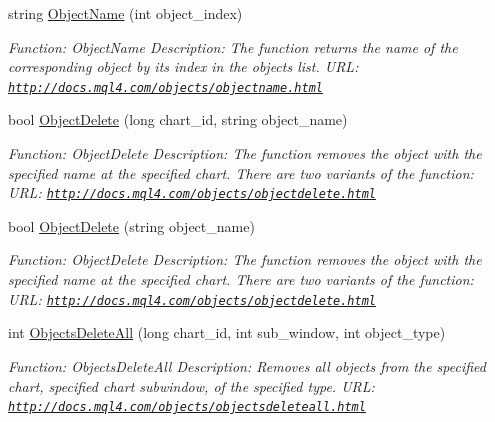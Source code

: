 \begin{DoxyCompactItemize}
string \hyperlink{class_m_q_l4_c_sharp_1_1_base_1_1_m_q_l_base_a199afa072d65c10291f0b877c13c0fcc}{Object\+Name} (int object\+\_\+index)
\begin{DoxyCompactList}\small\item\em Function\+: Object\+Name Description\+: The function returns the name of the corresponding object by its index in the objects list. U\+RL\+: \href{http://docs.mql4.com/objects/objectname.html}{\tt http\+://docs.\+mql4.\+com/objects/objectname.\+html} \end{DoxyCompactList}\item 
bool \hyperlink{class_m_q_l4_c_sharp_1_1_base_1_1_m_q_l_base_a344348b7c94f3685e2a0608f76053f0f}{Object\+Delete} (long chart\+\_\+id, string object\+\_\+name)
\begin{DoxyCompactList}\small\item\em Function\+: Object\+Delete Description\+: The function removes the object with the specified name at the specified chart. There are two variants of the function\+: U\+RL\+: \href{http://docs.mql4.com/objects/objectdelete.html}{\tt http\+://docs.\+mql4.\+com/objects/objectdelete.\+html} \end{DoxyCompactList}\item 
bool \hyperlink{class_m_q_l4_c_sharp_1_1_base_1_1_m_q_l_base_ae3ff3a2874228d3aeae93ec5880a7322}{Object\+Delete} (string object\+\_\+name)
\begin{DoxyCompactList}\small\item\em Function\+: Object\+Delete Description\+: The function removes the object with the specified name at the specified chart. There are two variants of the function\+: U\+RL\+: \href{http://docs.mql4.com/objects/objectdelete.html}{\tt http\+://docs.\+mql4.\+com/objects/objectdelete.\+html} \end{DoxyCompactList}\item 
int \hyperlink{class_m_q_l4_c_sharp_1_1_base_1_1_m_q_l_base_ac9b2a64a847b83ce840671a6703374ec}{Objects\+Delete\+All} (long chart\+\_\+id, int sub\+\_\+window, int object\+\_\+type)
\begin{DoxyCompactList}\small\item\em Function\+: Objects\+Delete\+All Description\+: Removes all objects from the specified chart, specified chart subwindow, of the specified type. U\+RL\+: \href{http://docs.mql4.com/objects/objectsdeleteall.html}{\tt http\+://docs.\+mql4.\+com/objects/objectsdeleteall.\+html} \end{DoxyCompactList}\item 

\end{DoxyCompactItemize}
